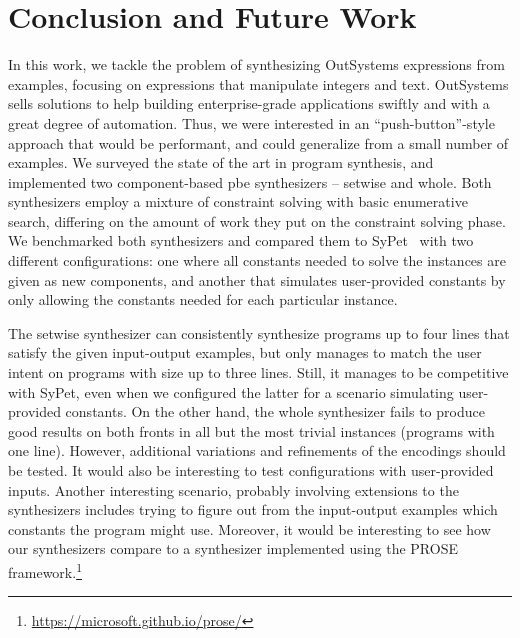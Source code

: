 \chapter{Conclusion and Future Work}
\label{chap:conclusion}

In this work, we tackle the problem of synthesizing OutSystems expressions from
examples, focusing on expressions that manipulate integers and text.
OutSystems sells solutions to help building enterprise-grade applications
swiftly and with a great degree of automation.
Thus, we were interested in an ``push-button''-style approach that would be
performant, and could generalize from a small number of examples.
We surveyed the state of the art in program synthesis, and implemented two
component-based \gls{pbe} synthesizers -- setwise and whole.
Both synthesizers employ a mixture of constraint solving with basic enumerative
search, differing on the amount of work they put on the constraint solving
phase.
We benchmarked both synthesizers and compared them to SyPet~\cite{Feng:2017:CSC}
with two different configurations: one where all constants needed to solve the
instances are given as new components, and another that simulates
user-provided constants by only allowing the constants needed for each
particular instance.

The setwise synthesizer can consistently synthesize programs up to four lines
that satisfy the given input-output examples, but only manages to match the user
intent on programs with size up to three lines.
Still, it manages to be competitive with SyPet, even when we configured the
latter for a scenario simulating user-provided constants.
On the other hand, the whole synthesizer fails to produce good results on both
fronts in all but the most trivial instances (programs with one line).
However, additional variations and refinements of the encodings should be
tested.
It would also be interesting to test configurations with user-provided inputs.
Another interesting scenario, probably involving extensions to the synthesizers
includes trying to figure out from the input-output examples which constants the
program might use.
Moreover, it would be interesting to see how our synthesizers compare to a
synthesizer implemented using the PROSE
framework.\footnote{\url{https://microsoft.github.io/prose/}}

